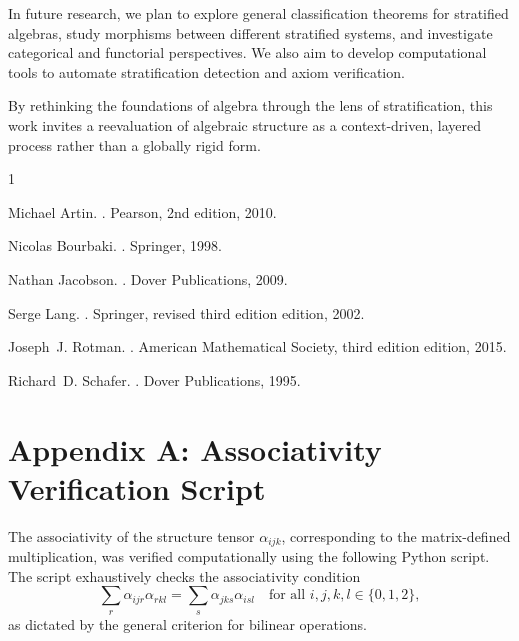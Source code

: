 \documentclass[12pt]{article}
\theoremstyle{definition}
\theoremstyle{plain}
\theoremstyle{remark}
\begin{document}
In future research, we plan to explore general classification theorems for stratified algebras, study morphisms between different stratified systems, and investigate categorical and functorial perspectives. We also aim to develop computational tools to automate stratification detection and axiom verification.

\medskip

\noindent By rethinking the foundations of algebra through the lens of stratification, this work invites a reevaluation of algebraic structure as a context-driven, layered process rather than a globally rigid form.


% 
% 


\begin{thebibliography}{1}

Michael Artin.
.
\newblock Pearson, 2nd edition, 2010.

Nicolas Bourbaki.
.
\newblock Springer, 1998.

Nathan Jacobson.
.
\newblock Dover Publications, 2009.

Serge Lang.
.
\newblock Springer, revised third edition edition, 2002.

Joseph~J. Rotman.
.
\newblock American Mathematical Society, third edition edition, 2015.

Richard~D. Schafer.
.
\newblock Dover Publications, 1995.

\end{thebibliography}


\newpage
\appendix
\section*{Appendix A: Associativity Verification Script}

The associativity of the structure tensor \( \alpha_{ijk} \), corresponding to the matrix-defined multiplication, was verified computationally using the following Python script. The script exhaustively checks the associativity condition
\[
\sum_r \alpha_{ijr} \alpha_{rkl} = \sum_s \alpha_{jks} \alpha_{isl}
\quad \text{for all } i, j, k, l \in \{0,1,2\},
\]
as dictated by the general criterion for bilinear operations.
\end{document}
